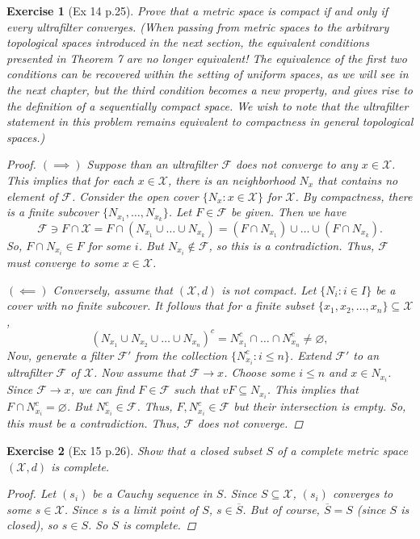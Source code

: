 \documentclass[11pt]{article}
\newtheorem{exercise}{Exercise}
\newcommand{\F}{\mathcal{F}}
\newcommand{\X}{\mathcal{X}}
\newcommand{\lp}{\left(}
\newcommand{\rp}{\right)}
\begin{document}
\begin{exercise}[Ex 14 p.25]
	Prove that a metric space is compact if and only if every ultrafilter converges.
	(When passing from metric spaces to the arbitrary topological spaces introduced in the next section, the equivalent conditions presented in Theorem 7 are no longer equivalent! The equivalence of the first two conditions can be recovered within the setting of uniform spaces, as we will see in the next chapter, but the third condition becomes a new property, and gives rise to the definition of a \textit{sequentially compact} space. We wish to note that the ultrafilter statement in this problem remains equivalent to compactness in general topological spaces.)
	\begin{proof}
		$(\implies)$ Suppose than an ultrafilter $\F$ does not converge to any $x\in \X$. This implies that for each $x\in \X$, there is an neighborhood $N_x$ that contains no element of $\F$. Consider the open cover $\{ N_x : x\in \X \}$ for $\X$. By compactness, there is a finite subcover $\{ N_{x_1},\dots, N_{x_k} \}$. Let $F\in \F$ be given. Then we have
		\begin{equation*}
		\F \ni F\cap \X = F \cap \lp N_{x_1} \cup \dots \cup N_{x_k} \rp = (F \cap N_{x_1}) \cup \dots \cup (F\cap N_{x_k}) .
		\end{equation*}
		So, $F\cap N_{x_i} \in F$ for some $i$. But $N_{x_i} \not\in \F$, so this is a contradiction. Thus, $\F$ must converge to some $x\in \X$.
		
		$(\impliedby)$ Conversely, assume that $(\X,d)$ is not compact. Let $\{N_i : i\in I \}$ be a cover with no finite subcover. It follows that for a finite subset $\{ x_1,x_2,\dots, x_n\} \subseteq \X$, 
		\begin{equation*}
		(N_{x_1} \cup N_{x_2} \cup \dots \cup N_{x_n})^c = N_{x_1}^c \cap \dots \cap N_{x_n}^c \neq \varnothing,
		\end{equation*} 
		Now, generate a filter $\F'$ from the collection $\{ N_{x_i}^c : i \leq n \}$. Extend $\F'$ to an ultrafilter $\F$ of $\X$. Now assume that $\F \to x$. Choose some $i\leq n$ and $x\in N_{x_i}$. Since $\F \to x$, we can find $F \in \F$ such that $vF \subseteq N_{x_i}$. This implies that $F \cap N_{x_i}^c = \varnothing$. But $N_{x_i}^c \in \F$. Thus, $F, N_{x_i}^c \in \F$ but their intersection is empty. So, this must be a contradiction. Thus, $\F$ does not converge. 
	\end{proof}
\end{exercise}

\begin{exercise}[Ex 15 p.26]
	Show that a closed subset $S$ of a complete metric space $(\X,d)$ is complete.
	\begin{proof}
		Let $(s_i)$ be a Cauchy sequence in $S$. Since $S\subseteq \X$, $(s_i)$ converges to some $s\in \X$. Since $s$ is a limit point of $S$, $s\in \overline{S}$. But of course, $\overline{S} =S$ (since $S$ is closed), so $s\in S$. So $S$ is complete. 
	\end{proof}
\end{exercise}
\end{document}

